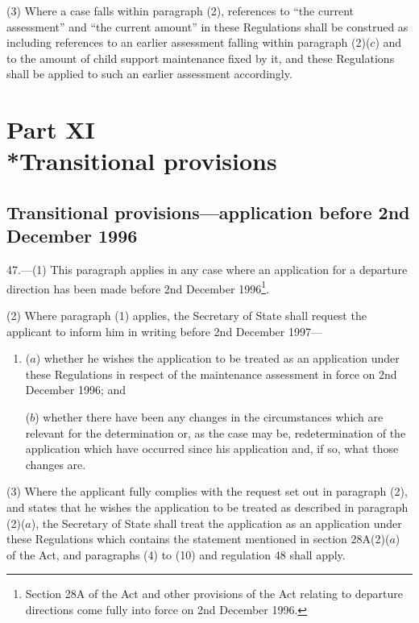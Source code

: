 \documentclass[a4paper]{article}
\newcommand{\parthead}{}
\begin{document}
(3) Where a case falls within paragraph (2), references to “the current
assessment” and “the current amount” in these Regulations shall be construed as
including references to an earlier assessment falling within paragraph (2)($c$)
and to the amount of child support maintenance fixed by it, and these
Regulations shall be applied to such an earlier assessment accordingly.

\section[Part XI --- Transitional provisions]{Part XI\\*Transitional provisions}

\renewcommand\parthead{--- Part XI}

\subsection[47. Transitional provisions—application before 2nd
December 1996]{Transitional provisions—application before 2nd
December 1996}

47.—(1) This paragraph applies in any case where an application for
a departure direction has been made before 2nd December 1996\footnote{\frenchspacing Section 28A of the Act and other provisions of the Act relating to departure directions come fully into force on 2nd December 1996.}.

(2) Where paragraph (1) applies, the Secretary of State shall request the
applicant to inform him in writing before 2nd December 1997—
\begin{enumerate}\item[]
($a$) whether he wishes the application to be treated as an application under these
Regulations in respect of the maintenance assessment in force on 2nd December
1996; and

($b$) whether there have been any changes in the circumstances which are relevant
for the determination or, as the case may be, redetermination of the application
which have occurred since his application and, if so, what those changes are.
\end{enumerate}

(3) Where the applicant fully complies with the request set out in paragraph
(2), and states that he wishes the application to be treated as described in
paragraph (2)($a$), the Secretary of State shall treat the application as an
application under these Regulations which contains the statement mentioned in
section 28A(2)($a$) of the Act, and paragraphs (4) to (10) and regulation 48 shall
apply.
\end{document}
